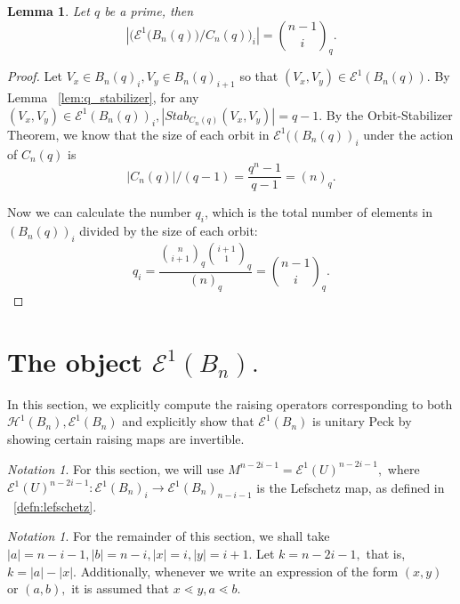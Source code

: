 \documentclass[10 pt]{amsart}
\theoremstyle{plain}
\newtheorem{lem}[thm]{Lemma}
\theoremstyle{definition}
\theoremstyle{remark}
\newtheorem{note}[thm]{Notation}
\numberwithin{equation}{section}
\begin{document}
\begin{lem} 
\label{lem:cyclic_q_analog_ranks}
Let $q$ be a prime,  then $$ |\big( \mathcal E^1 \big(B_n(q)\big)/C_n(q) \big)_i| = {n-1 \choose i}_q.$$
\end{lem}

\begin{proof}

Let $V_x \in B_n(q)_i,V_y \in B_n(q)_{i+1}$ so that $(V_x, V_y) \in \mathcal E^1 (B_n(q))$. By Lemma ~\ref{lem:q_stabilizer}, for any $(V_x, V_y) \in \mathcal E ^1 (B_n(q))_i,|Stab_{C_n(q)}(V_x, V_y)|=q-1.$  By the Orbit-Stabilizer Theorem, we know that the size of each orbit in $\mathcal E^1 ((B_n(q))_i$ under the action of $C_n(q)$ is $$|C_n(q)|/(q-1) = \frac{q^n-1}{q-1} = (n)_q.$$

Now we can calculate the number $q_i$, which is the total number of elements in $(B_n(q))_i$ divided by the size of each orbit:$$q_i = \frac{{n \choose i+1}_q {i+1 \choose 1}_q}{(n)_q} = {n-1 \choose i}_q. $$
\end{proof}







\section{The object $\mathcal E^1(B_n).$}
\label{sec:unitary_peck_f}
In this section, we explicitly compute the raising operators corresponding to both \linebreak $\mathcal H^1(B_n),\mathcal E^1(B_n)$ and explicitly show that $\mathcal E^1(B_n)$ is unitary Peck by showing certain raising maps are invertible.

\begin{note}
For this section, we will use $M^{n-2i-1} = \mathcal E^1(U)^{n-2i-1},$ where $\mathcal E^1(U)^{n-2i-1}:\mathcal E^1(B_n)_i \rightarrow \mathcal E^1(B_n)_{n-i-1}$ is the Lefschetz map, as defined in ~\ref{defn:lefschetz}.
\end{note}
\begin{note}
For the remainder of this section, we shall take $|a| = n-i-1,|b|= n-i,|x| = i,|y| = i+1.$ Let $k = n-2i-1,$ that is, $k = |a| - |x|.$ Additionally, whenever we write an expression of the form $(x, y)$ or $(a, b),$ it is assumed that $x \lessdot y,a \lessdot b.$
\end{note}
\end{document}
